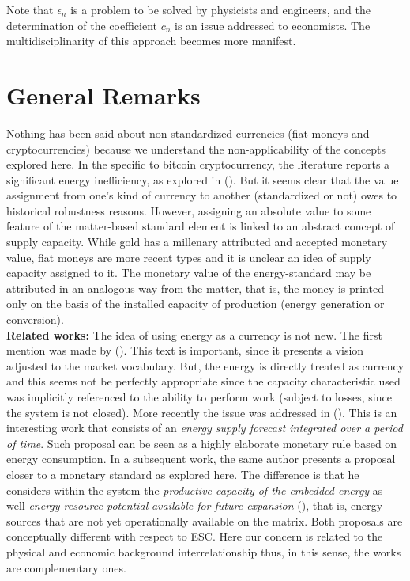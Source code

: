 \documentclass[11pt]{article}
\begin{document}
Note that $\epsilon_n$ is a problem to be solved by physicists and engineers, and the determination of the coefficient $c_n$ is an issue 
addressed to economists. The multidisciplinarity of this approach becomes more manifest.

\section{General Remarks}\label{general_remarks}

Nothing has been said about non-standardized currencies (fiat moneys and cryptocurrencies) because we understand the non-applicability of 
the concepts explored here. In the specific to bitcoin cryptocurrency, the literature reports a significant energy inefficiency, as 
explored in (\citealt{BITCOIN01}). But it seems clear that the value assignment from one's kind of currency to another (standardized or 
not) owes to historical robustness reasons. However, assigning an absolute value to some feature of the matter-based standard element is 
linked to an abstract concept of supply capacity. While gold has a millenary attributed and accepted monetary value, fiat moneys are more 
recent types and it is unclear an idea of supply capacity assigned to it. The monetary value of the energy-standard may be attributed in an 
analogous way from the matter, that is, the money is printed only on the basis of the installed capacity of production (energy generation 
or conversion).
\\

\noindent\textbf{Related works:} The idea of using energy as a currency is not new. The first mention was made by 
(\citealt{PROP_ENERGIA_ANTERIOR1}). This text is important, since it presents a vision adjusted to the market vocabulary. But, the energy 
is directly treated as currency and this seems not be perfectly appropriate since the capacity characteristic used was implicitly 
referenced to the ability to perform work (subject to losses, since the system is not closed). More recently the issue was addressed in 
(\citealt{PROP_ENERGIA_ANTERIOR3}). This is an interesting work that consists of an \emph{energy supply forecast integrated over a period of 
time}. Such proposal can be seen as a highly elaborate monetary rule based on energy consumption. In a subsequent work, the same author 
presents a proposal closer to a monetary standard as explored here. The difference is that he considers within the system the 
\emph{productive capacity of the embedded energy} as well \emph{energy resource potential}\footnotemark {} \emph{available for future expansion} 
(\citealp[p.7]{PROP_ENERGIA_ANTERIOR2}), that is, energy sources that are not yet operationally available on the matrix. Both proposals are 
conceptually different with respect to ESC. Here our concern is related to the physical and economic background interrelationship thus, in 
this sense, the works are complementary ones.
\end{document}
